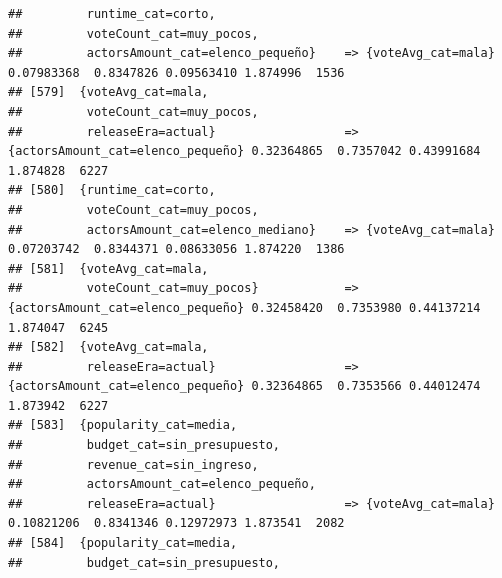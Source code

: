 \documentclass[
]{article}
\begin{document}
\begin{verbatim}
##         runtime_cat=corto,                                                                                                      
##         voteCount_cat=muy_pocos,                                                                                                
##         actorsAmount_cat=elenco_pequeño}    => {voteAvg_cat=mala}                0.07983368  0.8347826 0.09563410 1.874996  1536
## [579]  {voteAvg_cat=mala,                                                                                                       
##         voteCount_cat=muy_pocos,                                                                                                
##         releaseEra=actual}                  => {actorsAmount_cat=elenco_pequeño} 0.32364865  0.7357042 0.43991684 1.874828  6227
## [580]  {runtime_cat=corto,                                                                                                      
##         voteCount_cat=muy_pocos,                                                                                                
##         actorsAmount_cat=elenco_mediano}    => {voteAvg_cat=mala}                0.07203742  0.8344371 0.08633056 1.874220  1386
## [581]  {voteAvg_cat=mala,                                                                                                       
##         voteCount_cat=muy_pocos}            => {actorsAmount_cat=elenco_pequeño} 0.32458420  0.7353980 0.44137214 1.874047  6245
## [582]  {voteAvg_cat=mala,                                                                                                       
##         releaseEra=actual}                  => {actorsAmount_cat=elenco_pequeño} 0.32364865  0.7353566 0.44012474 1.873942  6227
## [583]  {popularity_cat=media,                                                                                                   
##         budget_cat=sin_presupuesto,                                                                                             
##         revenue_cat=sin_ingreso,                                                                                                
##         actorsAmount_cat=elenco_pequeño,                                                                                        
##         releaseEra=actual}                  => {voteAvg_cat=mala}                0.10821206  0.8341346 0.12972973 1.873541  2082
## [584]  {popularity_cat=media,                                                                                                   
##         budget_cat=sin_presupuesto,                                                                                             

\end{verbatim}
\end{document}
